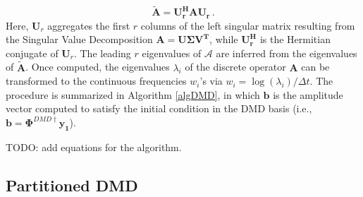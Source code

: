 \documentclass{anstrans}
\renewcommand{\vec}[1]{\bm{#1}} %
\begin{document}
\begin{equation}
\mathbf{\tilde{A}} = \mathbf{U_r^{H}AU_r} \, .
\end{equation}
Here, $\mathbf{U}_r$ aggregates the first $r$ columns of the left singular matrix resulting from the Singular Value Decomposition $ {\mathbf{A = U\Sigma V^T}}$, while $ \mathbf{U_r^{H}}$ is the Hermitian conjugate of $\mathbf{U}_r$.
The leading $r$ eigenvalues of $\mathcal{A}$ are inferred from the eigenvalues of $\mathbf{\tilde{A}}$. 
Once computed, the eigenvalues $\lambda_i$ of the discrete operator $\mathbf{A}$ can be transformed to the continuous frequencies $w_i$'s via $w_i=\log(\lambda_i)/\Delta t$.
The procedure is summarized in Algorithm \ref{algDMD}, in which $\vec{b}$ is the amplitude vector computed to satisfy the initial condition in the DMD basis (i.e., $\vec{b}={\boldsymbol{\Phi}^{DMD\dagger}} \vec{y_1}$).

TODO: add equations for the algorithm.

\subsection{Partitioned DMD}

\end{document}
